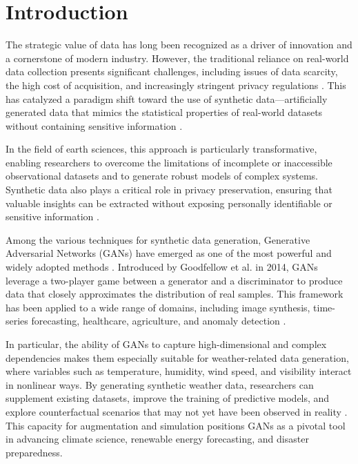 \documentclass[12pt, draftclsnofoot, onecolumn]{IEEEtran}
\begin{document}
\section{Introduction}

The strategic value of data has long been recognized as a driver of innovation and a cornerstone of modern industry. However, the traditional reliance on real-world data collection presents significant challenges, including issues of data scarcity, the high cost of acquisition, and increasingly stringent privacy regulations \cite{ref1,ref2,ref3}. This has catalyzed a paradigm shift toward the use of synthetic data—artificially generated data that mimics the statistical properties of real-world datasets without containing sensitive information \cite{ref4,ref5,ref6}. 

In the field of earth sciences, this approach is particularly transformative, enabling researchers to overcome the limitations of incomplete or inaccessible observational datasets and to generate robust models of complex systems. Synthetic data also plays a critical role in privacy preservation, ensuring that valuable insights can be extracted without exposing personally identifiable or sensitive information \cite{ref3,ref14}. 

Among the various techniques for synthetic data generation, Generative Adversarial Networks (GANs) have emerged as one of the most powerful and widely adopted methods \cite{ref15,ref16}. Introduced by Goodfellow et al. in 2014, GANs leverage a two-player game between a generator and a discriminator to produce data that closely approximates the distribution of real samples. This framework has been applied to a wide range of domains, including image synthesis, time-series forecasting, healthcare, agriculture, and anomaly detection \cite{ref7,ref8,ref9,ref10,ref11,ref12,ref19}. 

In particular, the ability of GANs to capture high-dimensional and complex dependencies makes them especially suitable for weather-related data generation, where variables such as temperature, humidity, wind speed, and visibility interact in nonlinear ways. By generating synthetic weather data, researchers can supplement existing datasets, improve the training of predictive models, and explore counterfactual scenarios that may not yet have been observed in reality \cite{ref19,ref20,ref21}. This capacity for augmentation and simulation positions GANs as a pivotal tool in advancing climate science, renewable energy forecasting, and disaster preparedness.
\end{document}
